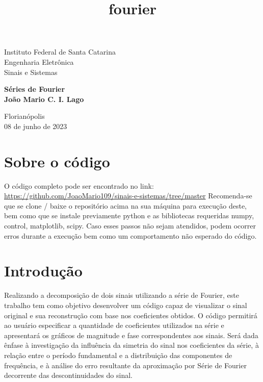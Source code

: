 \documentclass{article}
\title{fourier}
\begin{document}
    
\begin{titlepage}
    \begin{center}
        \vspace*{1cm}
        
        
        
        \vspace{0.5cm}
        \Large{Instituto Federal de Santa Catarina\\
        Engenharia Eletrônica\\
        Sinais e Sistemas}
        
        \vspace{5.5cm}
        
        \textbf{Séries de Fourier}\\
        \textbf{João Mario C. I. Lago}
        
        \vfill
        
        Florianópolis\\
        08 de junho de 2023
        
    \end{center}
\end{titlepage}


\hypertarget{sobre-o-cuxf3digo}{%
\section{Sobre o código}\label{sobre-o-cuxf3digo}}

O código completo pode ser encontrado no link:
\url{https://github.com/JoaoMario109/sinais-e-sistemas/tree/master}
Recomenda-se que se clone / baixe o repositório acima na sua máquina
para execução deste, bem como que se instale previamente python e as
bibliotecas requeridas numpy, control, matplotlib, scipy. Caso esses
passos não sejam atendidos, podem ocorrer erros durante a execução bem
como um comportamento não esperado do código.

    \hypertarget{introduuxe7uxe3o}{%
\section{Introdução}\label{introduuxe7uxe3o}}

Realizando a decomposição de dois sinais utilizando a série de Fourier,
este trabalho tem como objetivo desenvolver um código capaz de
visualizar o sinal original e sua reconstrução com base nos coeficientes
obtidos. O código permitirá ao usuário especificar a quantidade de
coeficientes utilizados na série e apresentará os gráficos de magnitude
e fase correspondentes aos sinais. Será dada ênfase à investigação da
influência da simetria do sinal nos coeficientes da série, à relação
entre o período fundamental e a distribuição das componentes de
frequência, e à análise do erro resultante da aproximação por Série de
Fourier decorrente das descontinuidades do sinal.
\end{document}
